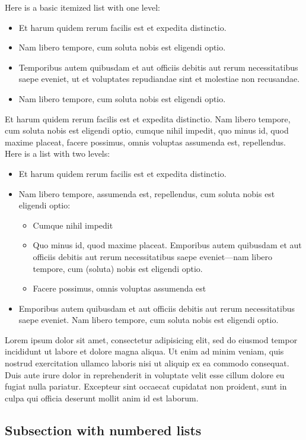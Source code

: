 \documentclass[letterpaper,11pt,leqno]{article}
\begin{document}
Here is a basic itemized list with one level:
\begin{itemize}
\item Et harum quidem rerum facilis est et expedita distinctio.
\item Nam libero tempore, cum soluta nobis est eligendi optio.
\item Temporibus autem quibusdam et aut officiis debitis aut rerum necessitatibus saepe eveniet, ut et voluptates repudiandae sint et molestiae non recusandae.
\item Nam libero tempore, cum soluta nobis est eligendi optio.
\end{itemize}
Et harum quidem rerum facilis est et expedita distinctio. Nam libero tempore, cum soluta nobis est eligendi optio, cumque nihil impedit, quo minus id, quod maxime placeat, facere possimus, omnis voluptas assumenda est, repellendus. Here is a list with two levels:
\begin{itemize}
\item Et harum quidem rerum facilis est et expedita distinctio.
\item Nam libero tempore, assumenda est, repellendus, cum soluta nobis est eligendi optio:
\begin{itemize}
\item Cumque nihil impedit
\item Quo minus id, quod maxime placeat. Emporibus autem quibusdam et aut officiis debitis aut rerum necessitatibus saepe eveniet---nam libero tempore, cum (soluta) nobis est eligendi optio.
\item Facere possimus, omnis voluptas assumenda est
\end{itemize}
\item Emporibus autem quibusdam et aut officiis debitis aut rerum necessitatibus saepe eveniet. Nam libero tempore, cum soluta nobis est eligendi optio.
\end{itemize}
Lorem ipsum dolor sit amet, consectetur adipisicing elit, sed do eiusmod tempor incididunt ut labore et dolore magna aliqua. Ut enim ad minim veniam, quis nostrud exercitation ullamco laboris nisi ut aliquip ex ea commodo consequat. Duis aute irure dolor in reprehenderit in voluptate velit esse cillum dolore eu fugiat nulla pariatur. Excepteur sint occaecat cupidatat non proident, sunt in culpa qui officia deserunt mollit anim id est laborum.

\subsection{Subsection with numbered lists}\label{s:numberedlists}
\end{document}
